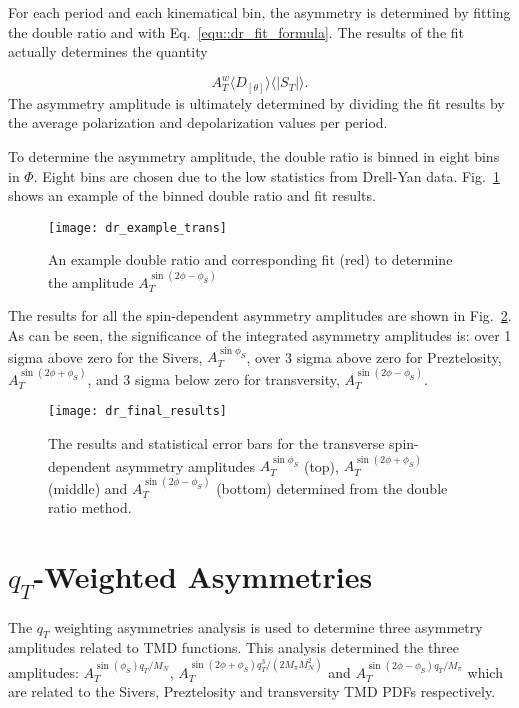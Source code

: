 For each period and each kinematical bin, the asymmetry is determined by fitting
the double ratio and with Eq.~\ref{equ::dr_fit_formula}.  The results of the fit
actually determines the quantity

\begin{equation}
  A^w_T \langle D_{[\theta]} \rangle \langle |S_T|\rangle.
\end{equation}
\noindent
The asymmetry amplitude is ultimately determined by dividing the fit results by
the average polarization and depolarization values per period.

To determine the asymmetry amplitude, the double ratio is binned in eight bins
in $\Phi$.  Eight bins are chosen due to the low statistics from Drell-Yan data.
Fig.~\ref{fig::dr_example_trans} shows an example of the binned double ratio and
fit results.

\begin{figure}[h!t]
  \centering \texttt{[image: dr\_example\_trans]}
  \caption{An example double ratio and corresponding fit (red) to determine the
    amplitude $A_T^{\sin(2\phi-\phi_S)}$}
  \label{fig::dr_example_trans}
\end{figure}

\noindent
The results for all the spin-dependent asymmetry amplitudes are shown in
Fig.~\ref{fig::dr_final_results}.  As can be seen, the significance of the
integrated asymmetry amplitudes is: over 1 sigma above zero for the Sivers,
$A^{\sin\phi_S}_T$, over 3 sigma above zero for Preztelosity,
$A^{\sin(2\phi+\phi_S)}_T$, and 3 sigma below zero for transversity,
$A^{\sin(2\phi-\phi_S)}_T$.

\begin{figure}[h!t]
  \centering \texttt{[image: dr\_final\_results]}
  \caption{The results and statistical error bars for the transverse
    spin-dependent asymmetry amplitudes $A^{\sin\phi_S}_T$ (top),
    $A^{\sin(2\phi+\phi_S)}_T$ (middle) and $A^{\sin(2\phi-\phi_S)}_T$ (bottom)
    determined from the double ratio method.}
  \label{fig::dr_final_results}
\end{figure}


\section{$q_T$-Weighted Asymmetries} \label{sec::qtweighted}
The $q_T$ weighting asymmetries analysis is used to determine three asymmetry
amplitudes related to TMD functions.  This analysis determined the three
amplitudes: $A_T^{\sin(\phi_S) q_T/M_N}$, $A_T^{\sin(2\phi+\phi_S)
  q^3_T/(2M_{\pi}M_N^2)}$ and $A_T^{\sin(2\phi-\phi_S) q_T/M_{\pi}}$ which are
related to the Sivers, Preztelosity and transversity TMD PDFs respectively.

